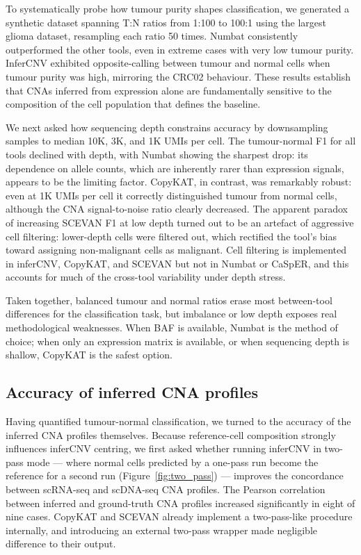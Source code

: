 \documentclass[11pt]{article}
\begin{document}
To systematically probe how tumour purity shapes classification, we
generated a synthetic dataset spanning T:N ratios from 1:100 to 100:1 using
the largest glioma dataset, resampling each ratio 50 times. Numbat
consistently outperformed the other tools, even in extreme cases with very
low tumour purity. InferCNV exhibited opposite-calling between tumour and
normal cells when tumour purity was high, mirroring the CRC02 behaviour.
These results establish that CNAs inferred from expression alone are
fundamentally sensitive to the composition of the cell population that
defines the baseline.

We next asked how sequencing depth constrains accuracy by downsampling
samples to median 10K, 3K, and 1K UMIs per cell. The tumour-normal F1 for
all tools declined with depth, with Numbat showing the sharpest drop: its
dependence on allele counts, which are inherently rarer than expression
signals, appears to be the limiting factor. CopyKAT, in contrast, was
remarkably robust: even at 1K UMIs per cell it correctly distinguished
tumour from normal cells, although the CNA signal-to-noise ratio clearly
decreased. The apparent paradox of increasing SCEVAN F1 at low depth turned
out to be an artefact of aggressive cell filtering: lower-depth cells were
filtered out, which rectified the tool's bias toward assigning non-malignant
cells as malignant. Cell filtering is implemented in inferCNV, CopyKAT, and
SCEVAN but not in Numbat or CaSpER, and this accounts for much of the
cross-tool variability under depth stress.

Taken together, balanced tumour and normal ratios erase most between-tool
differences for the classification task, but imbalance or low depth exposes
real methodological weaknesses. When BAF is available, Numbat is the method
of choice; when only an expression matrix is available, or when sequencing
depth is shallow, CopyKAT is the safest option.

\subsection{Accuracy of inferred CNA profiles}

Having quantified tumour-normal classification, we turned to the accuracy of
the inferred CNA profiles themselves. Because reference-cell composition
strongly influences inferCNV centring, we first asked whether running
inferCNV in two-pass mode --- where normal cells predicted by a one-pass run
become the reference for a second run (Figure~\ref{fig:two_pass}) ---
improves the concordance between scRNA-seq and scDNA-seq CNA profiles. The
Pearson correlation between inferred and ground-truth CNA profiles increased
significantly in eight of nine cases. CopyKAT and SCEVAN already implement a
two-pass-like procedure internally, and introducing an external two-pass
wrapper made negligible difference to their output.
\end{document}
